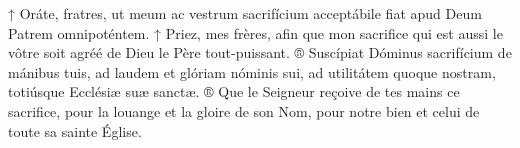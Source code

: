 \vspace{0.2cm}

\begin{paracol}{2}
\LigneParacol{0cm}
{↑ Oráte, fratres, ut meum ac vestrum sacrifícium acceptábile fiat apud Deum Patrem omnipoténtem.}
{↑ Priez, mes frères, afin que mon sacrifice qui est aussi le vôtre soit agréé de Dieu le Père tout-puissant.}
\LigneParacol{0cm}
{® Suscípiat Dóminus sacrifícium de mánibus tuis, ad laudem et glóriam nóminis sui, ad utilitátem quoque nostram, totiúsque Ecclésiæ suæ sanctæ.}
{® Que le Seigneur reçoive de tes mains ce sacrifice, pour la louange et la gloire de son Nom, pour notre bien et celui de toute sa sainte Église.}
\end{paracol}
